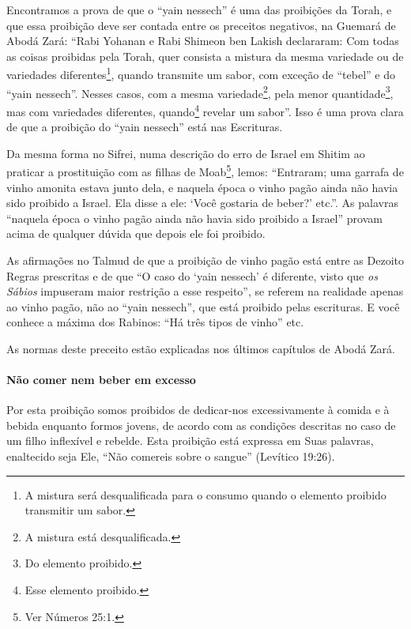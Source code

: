 Encontramos a prova de que o ``yain nessech'' é uma das proibições da
Torah, e que essa proibição deve ser contada entre os preceitos
negativos, na Guemará de Abodá Zará: ``Rabi Yohanan e Rabi Shimeon ben
Lakish declararam: Com todas as coisas proibidas pela Torah, quer
consista a mistura da mesma variedade ou de variedades
diferentes\footnote{A mistura será desqualificada para o consumo quando o elemento
  proibido transmitir um sabor.}, quando transmite um sabor, com exceção
de ``tebel'' e do ``yain nessech''. Nesses casos, com a mesma
variedade\footnote{A mistura está desqualificada.}, pela menor
quantidade\footnote{Do elemento proibido.}, mas com variedades diferentes,
quando\footnote{Esse elemento proibido.} revelar um sabor''. Isso é uma prova clara
de que a proibição do ``yain nessech'' está nas Escrituras.

Da mesma forma no Sifrei, numa descrição do erro de Israel em Shitim ao
praticar a prostituição com as filhas de Moab\footnote{Ver Números 25:1.},
lemos: ``Entraram; uma garrafa de vinho amonita estava junto dela, e naquela época o vinho pagão ainda não havia sido proibido a Israel. Ela disse a ele: `Você
gostaria de beber?' etc.''. As palavras ``naquela época o vinho pagão
ainda não havia sido proibido a Israel'' provam acima de qualquer dúvida
que depois ele foi proibido.

As afirmações no Talmud de que a proibição de vinho pagão está entre as
Dezoito Regras prescritas e de que ``O caso do `yain nessech' é
diferente, visto que \emph{os Sábios} impuseram maior restrição a esse
respeito'', se referem na realidade apenas ao vinho pagão, não ao
``yain nessech'', que está proibido pelas escrituras.
E você conhece a máxima dos Rabinos: ``Há três tipos de vinho'' etc.

As normas deste preceito estão explicadas nos últimos capítulos de Abodá Zará.

\paragraph{Não comer nem beber em excesso}

Por esta proibição somos proibidos de dedicar-nos excessivamente à
comida e à bebida enquanto formos jovens, de acordo com as condições
descritas no caso de um filho inflexível e rebelde. Esta proibição está
expressa em Suas palavras, enaltecido seja Ele, ``Não comereis sobre o
sangue'' (Levítico 19:26).

